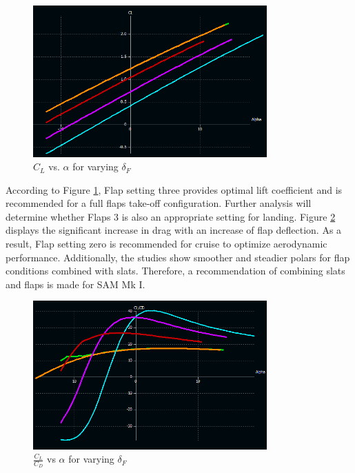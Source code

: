 \begin{figure}[!h]
    \centering
    \includegraphics[width=0.8\textwidth]{Photos/aero/CL_o_alpha.png}
    \caption{$C_L$ vs. $\alpha$ for varying $\delta_F$}
    \label{fig:clalphahigh}
\end{figure}
According to Figure \ref{fig:clalphahigh}, Flap setting three provides optimal lift coefficient and is recommended for a full flaps take-off configuration.  Further analysis will determine whether Flaps 3 is also an appropriate setting for landing.  Figure \ref{fig:clcdalphahigh} displays the significant increase in drag with an increase of flap deflection.  As a result, Flap setting zero is recommended for cruise to optimize aerodynamic performance.  Additionally, the studies show smoother and steadier polars for flap conditions combined with slats.  Therefore, a recommendation of combining slats and flaps is made for SAM Mk I.

\begin{figure}[!h]
    \centering
    \includegraphics[width=0.8\textwidth]{Photos/aero/CL_CD_o_alpha.png}
    \caption{$\frac{C_L}{C_D}$ vs $\alpha$ for varying $\delta_F$}
    \label{fig:clcdalphahigh}
\end{figure}

